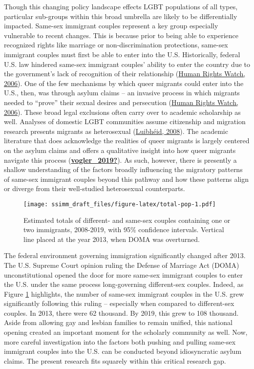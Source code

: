\documentclass[
  11pt,
]{article}
\begin{document}
Though this changing policy landscape effects LGBT populations of all types, particular sub-groups within this broad umbrella are likely to be differentially impacted. Same-sex immigrant couples represent a key group especially vulnerable to recent changes. This is because prior to being able to experience recognized rights like marriage or non-discrimination protections, same-sex immigrant couples must first be able to enter into the U.S. Historically, federal U.S. law hindered same-sex immigrant couples' ability to enter the country due to the government's lack of recognition of their relationship (\protect\hyperlink{ref-humanrightswatch_2006}{Human Rights Watch, 2006}). One of the few mechanisms by which queer migrants could enter into the U.S., then, was through asylum claims -- an invasive process in which migrants needed to ``prove'' their sexual desires and persecution (\protect\hyperlink{ref-humanrightswatch_2006}{Human Rights Watch, 2006}). These broad legal exclusions often carry over to academic scholarship as well. Analyses of domestic LGBT communities assume citizenship and migration research presents migrants as heterosexual (\protect\hyperlink{ref-luibheid_2008}{Luibhéid, 2008}). The academic literature that does acknowledge the realities of queer migrants is largely centered on the asylum claims and offers a qualitative insight into how queer migrants navigate this process (\protect\hyperlink{ref-vogler_2019}{\textbf{vogler\_2019?}}). As such, however, there is presently a shallow understanding of the factors broadly influencing the migratory patterns of same-sex immigrant couples beyond this pathway and how these patterns align or diverge from their well-studied heterosexual counterparts.

\begin{figure}
\centering
\texttt{[image: ssimm\_draft\_files/figure-latex/total-pop-1.pdf]}
\caption{\label{fig:total-pop}Estimated totals of different- and same-sex couples containing one or two immigrants, 2008-2019, with 95\% confidence intervals. Vertical line placed at the year 2013, when DOMA was overturned.}
\end{figure}

The federal environment governing immigration significantly changed after 2013. The U.S. Supreme Court opinion ruling the Defense of Marriage Act (DOMA) unconstitutional opened the door for more same-sex immigrant couples to enter the U.S. under the same process long-governing different-sex couples. Indeed, as Figure \ref{fig:total-pop} highlights, the number of same-sex immigrant couples in the U.S. grew significantly following this ruling -- especially when compared to different-sex couples. In 2013, there were 62 thousand. By 2019, this grew to 108 thousand. Aside from allowing gay and lesbian families to remain unified, this national opening created an important moment for the scholarly community as well. Now, more careful investigation into the factors both pushing and pulling same-sex immigrant couples into the U.S. can be conducted beyond idiosyncratic asylum claims. The present research fits squarely within this critical research gap.
\end{document}
